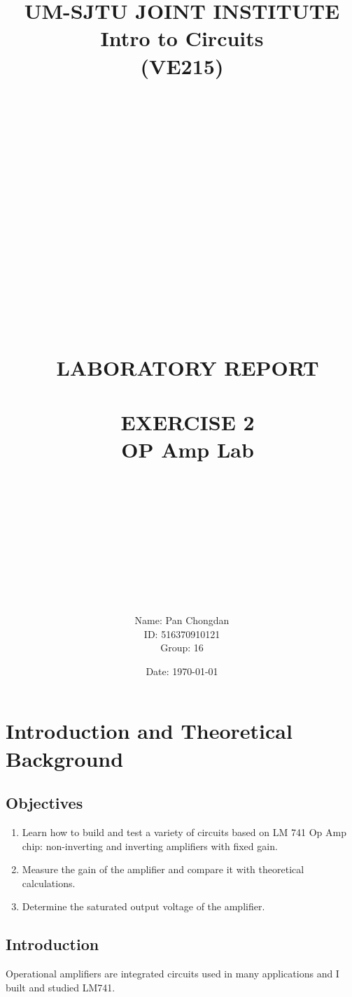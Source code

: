 \documentclass[12pt]{article}
\title{\large UM-SJTU JOINT INSTITUTE\\Intro to Circuits\\(VE215)\\\ \\\ \\\ \\\ \\\ \\\ \\\ \\\ \\\ \\\ \\\
LABORATORY REPORT\\\ \\\ EXERCISE 2\\\ OP Amp Lab \\\ \\\ \\\ \\\ \\\ }
\author{Name: Pan Chongdan\\ID: 516370910121\\Group: 16}
\date{Date: \today}
\begin{document}
\maketitle
\newpage
\section{Introduction and Theoretical Background}
\subsection{Objectives}
\begin{enumerate}
\item Learn how to build and test a variety of circuits based on LM 741 Op Amp chip: non-inverting and inverting amplifiers with fixed gain.
\item Measure the gain of the amplifier and compare it with theoretical calculations.
\item Determine the saturated output voltage of the amplifier.
\end{enumerate}
\subsection{Introduction}
Operational amplifiers are integrated circuits used in many applications and I built and studied LM741.
\end{document}
